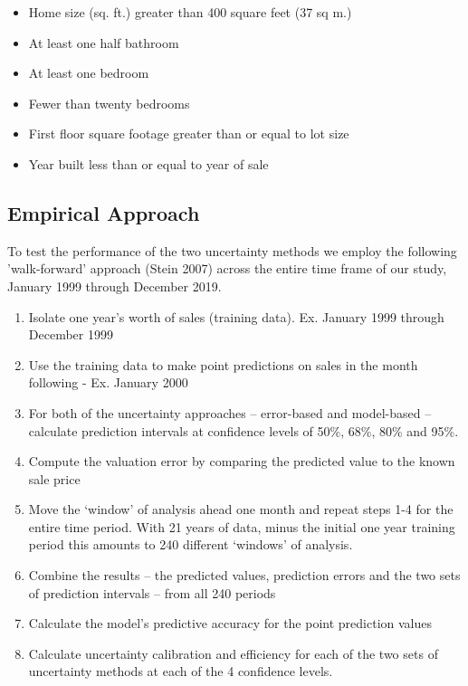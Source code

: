 \documentclass[colTwo]{anon}
\theoremstyle{definition}
\begin{document}
\begin{itemize}
\item Home size (sq. ft.) greater than 400 square feet (37 sq m.)
\item At least one half bathroom
\item At least one bedroom
\item Fewer than twenty bedrooms
\item First floor square footage greater than or equal to lot size
\item Year built less than or equal to year of sale 
\end{itemize}

\subsection{Empirical Approach}

To test the performance of the two uncertainty methods we employ the following 'walk-forward' approach (Stein 2007) across the entire time frame of our study, January 1999 through December 2019. 

\begin{enumerate}
\item Isolate one year’s worth of sales (training data). Ex. January 1999 through December 1999
\item Use the training data to make point predictions on sales in the month following - Ex. January 2000
\item For both of the uncertainty approaches -- error-based and model-based -- calculate prediction intervals at confidence levels of 50\%, 68\%, 80\% and 95\%. 
\item Compute the valuation error by comparing the predicted value to the known sale price
\item Move the ‘window’ of analysis ahead one month and repeat steps 1-4 for the entire time period.  With 21 years of data, minus the initial one year training period this amounts to 240 different ‘windows’ of analysis.
\item Combine the results -- the predicted values, prediction errors and the two sets of prediction intervals -- from all 240 periods
\item Calculate the model’s predictive accuracy for the point prediction values
\item Calculate uncertainty calibration and efficiency for each of the two sets of uncertainty methods at each of the 4 confidence levels.
\end{enumerate}
\end{document}
